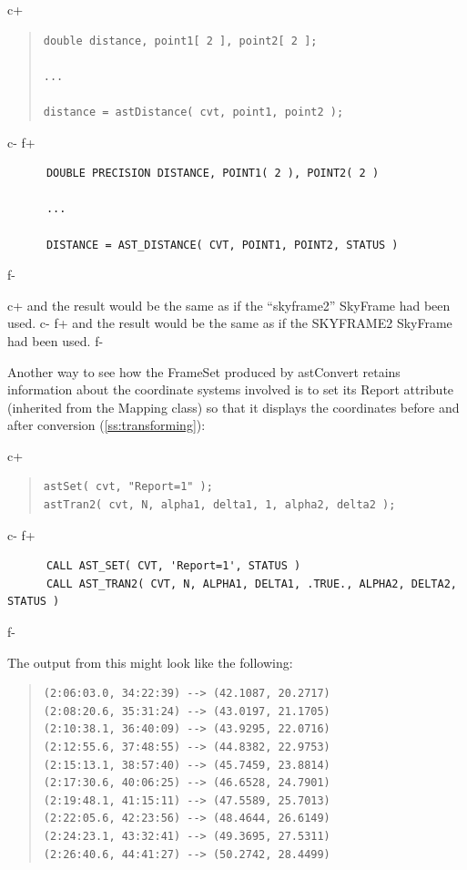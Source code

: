 \documentclass[twoside,11pt]{article}
\newcommand{\secref}[1]{\S\ref{#1}}
\renewcommand{\secref}[1]{\ref{#1}}
\begin{document}
c+
\begin{quote}
\small
\begin{verbatim}
double distance, point1[ 2 ], point2[ 2 ];

...

distance = astDistance( cvt, point1, point2 );
\end{verbatim}
\normalsize
\end{quote}
c-
f+
\small
\begin{verbatim}
      DOUBLE PRECISION DISTANCE, POINT1( 2 ), POINT2( 2 )

      ...

      DISTANCE = AST_DISTANCE( CVT, POINT1, POINT2, STATUS )
\end{verbatim}
\normalsize
f-

c+
and the result would be the same as if the ``skyframe2'' SkyFrame had
been used.
c-
f+
and the result would be the same as if the SKYFRAME2 SkyFrame had been
used.
f-

Another way to see how the FrameSet produced by astConvert retains
information about the coordinate systems involved is to set its Report
attribute (inherited from the Mapping class) so that it displays the
coordinates before and after conversion (\secref{ss:transforming}):

c+
\begin{quote}
\small
\begin{verbatim}
astSet( cvt, "Report=1" );
astTran2( cvt, N, alpha1, delta1, 1, alpha2, delta2 );
\end{verbatim}
\normalsize
\end{quote}
c-
f+
\small
\begin{verbatim}
      CALL AST_SET( CVT, 'Report=1', STATUS )
      CALL AST_TRAN2( CVT, N, ALPHA1, DELTA1, .TRUE., ALPHA2, DELTA2, STATUS )
\end{verbatim}
\normalsize
f-

The output from this might look like the following:

\begin{quote}
\begin{verbatim}
(2:06:03.0, 34:22:39) --> (42.1087, 20.2717)
(2:08:20.6, 35:31:24) --> (43.0197, 21.1705)
(2:10:38.1, 36:40:09) --> (43.9295, 22.0716)
(2:12:55.6, 37:48:55) --> (44.8382, 22.9753)
(2:15:13.1, 38:57:40) --> (45.7459, 23.8814)
(2:17:30.6, 40:06:25) --> (46.6528, 24.7901)
(2:19:48.1, 41:15:11) --> (47.5589, 25.7013)
(2:22:05.6, 42:23:56) --> (48.4644, 26.6149)
(2:24:23.1, 43:32:41) --> (49.3695, 27.5311)
(2:26:40.6, 44:41:27) --> (50.2742, 28.4499)
\end{verbatim}
\end{quote}
\end{document}
